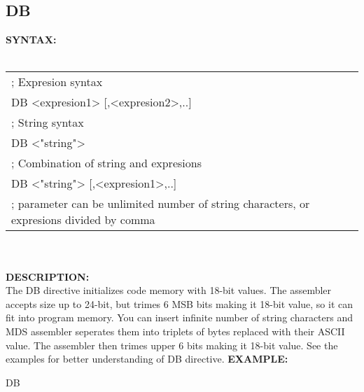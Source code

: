 {                \subsection{DB}
                \textbf{SYNTAX:}\\
                \\ {
                        \texttt{}
                        \begin{tabular}[h!]{llll}
                                { \color{highlight_comment} ; Expresion syntax}\\
                                { \color{highlight_directive} DB }
                                { \color{highlight_symbol}   <expresion1>  [,<expresion2>,..]}\\
                                { \color{highlight_comment} ; String syntax}\\
                                { \color{highlight_directive} DB }
                                { \color{highlight_symbol}   <"string">}\\
                                { \color{highlight_comment} ; Combination of string and expresions}\\
                                { \color{highlight_directive} DB }
                                { \color{highlight_symbol}   <"string"> [,<expresion1>,..]}\\
                                { \color{highlight_comment} ; parameter can be unlimited number of string characters, or expresions divided by comma}\\
                        \end{tabular}
                    }\\
                    \\
                \textbf{DESCRIPTION:}\\
                The DB directive initializes code memory with 18-bit values. The assembler accepts size up to 24-bit, but trimes 6 MSB bits making it 18-bit value,
                so it can fit into program memory. You can insert infinite number of string characters and MDS assembler seperates them into triplets of bytes replaced
                with their ASCII value. The assembler then trimes upper 6 bits making it 18-bit value.
                See the examples for better understanding of DB directive.
%
                \textbf{EXAMPLE:}\\
                        \begin{code}[h!]
                                { \color{highlight_directive} DB }

\end{code}}
